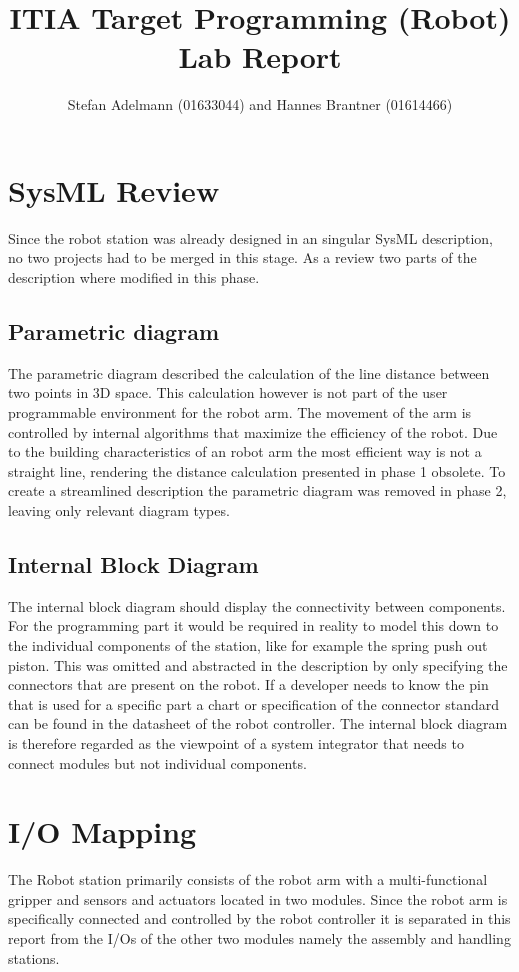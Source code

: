 \documentclass{article}
\title{ITIA Target Programming (Robot) Lab Report}
\author{Stefan Adelmann (01633044) and Hannes Brantner (01614466)}
\begin{document}
\maketitle{}
\clearpage{}
\section{SysML Review}
Since the robot station was already designed in an singular SysML description, no two projects had to be merged in this stage. As a review two parts of the description where modified in this phase.

\subsection{Parametric diagram}
The parametric diagram described the calculation of the line distance between two points in 3D space. This calculation however is not part of the user programmable environment for the robot arm. The movement of the arm is controlled by internal algorithms that maximize the efficiency of the robot. Due to the building characteristics of an robot arm the most efficient way is not a straight line, rendering the distance calculation presented in phase 1 obsolete. To create a streamlined description the parametric diagram was removed in phase 2, leaving only relevant diagram types.

\subsection{Internal Block Diagram}
The internal block diagram should display the connectivity between components. For the programming part it would be required in reality to model this down to the individual components of the station, like for example the spring push out piston. This was omitted and abstracted in the description by only specifying the connectors that are present on the robot. If a developer needs to know the pin that is used for a specific part a chart or specification of the connector standard can be found in the datasheet of the robot controller. The internal block diagram is therefore regarded as the viewpoint of a system integrator that needs to connect modules but not individual components.


\section{I/O Mapping}
The Robot station primarily consists of the robot arm with a multi-functional gripper and sensors and actuators located in two modules. Since the robot arm is specifically connected and controlled by the robot controller it is separated in this report from the I/Os of the other two modules namely the assembly and handling stations. 
\end{document}
